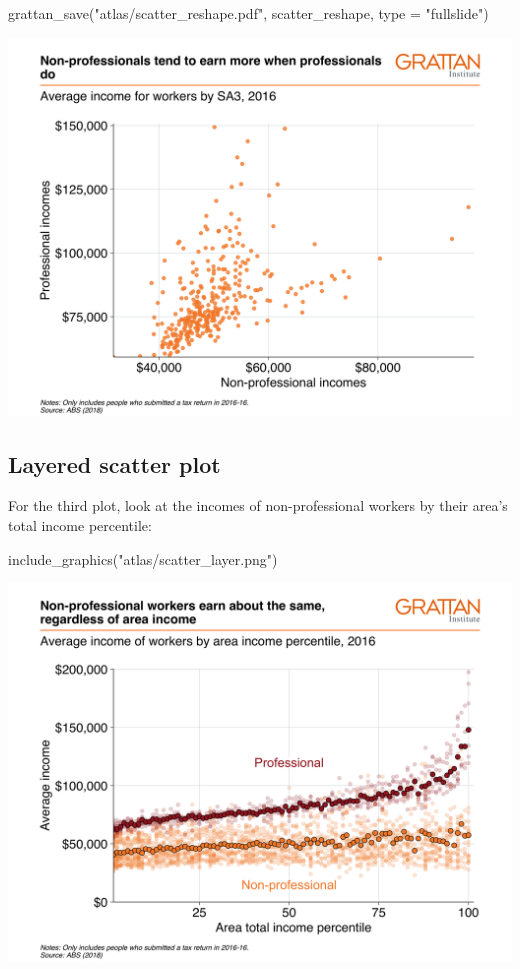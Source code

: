 \documentclass[
]{book}
\newenvironment{Shaded}{\begin{snugshade}}{\end{snugshade}}
\newcommand{\AttributeTok}[1]{\textcolor[rgb]{0.77,0.63,0.00}{#1}}
\newcommand{\FunctionTok}[1]{\textcolor[rgb]{0.00,0.00,0.00}{#1}}
\newcommand{\NormalTok}[1]{#1}
\newcommand{\StringTok}[1]{\textcolor[rgb]{0.31,0.60,0.02}{#1}}
\begin{document}
\begin{Shaded}
\begin{Highlighting}[]
\FunctionTok{grattan\_save}\NormalTok{(}\StringTok{"atlas/scatter\_reshape.pdf"}\NormalTok{, scatter\_reshape, }\AttributeTok{type =} \StringTok{"fullslide"}\NormalTok{)}
\end{Highlighting}
\end{Shaded}

\includegraphics[width=44.44in]{atlas/scatter_reshape}

\hypertarget{layered-scatter-plot}{%
\subsection{Layered scatter plot}\label{layered-scatter-plot}}

For the third plot, look at the incomes of non-professional workers by their area's total income percentile:

\begin{Shaded}
\begin{Highlighting}[]
\FunctionTok{include\_graphics}\NormalTok{(}\StringTok{"atlas/scatter\_layer.png"}\NormalTok{)}
\end{Highlighting}
\end{Shaded}

\includegraphics[width=44.44in]{atlas/scatter_layer}
\end{document}

